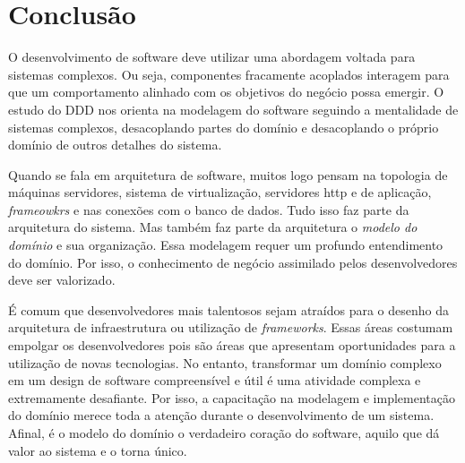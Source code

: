 \documentclass[a4paper, 12pt]{article}
\begin{document}
\section{Conclusão}

O desenvolvimento de software deve utilizar uma abordagem voltada para sistemas complexos. Ou seja, componentes fracamente acoplados interagem para que um comportamento alinhado com os objetivos do negócio possa emergir. O estudo do DDD nos orienta na modelagem do software seguindo a mentalidade de sistemas complexos, desacoplando partes do domínio e desacoplando o próprio domínio de outros detalhes do sistema. 

Quando se fala em arquitetura de software, muitos logo pensam na topologia de máquinas servidores, sistema de virtualização, servidores http e de aplicação, \emph{frameowkrs} e nas conexões com o banco de dados. Tudo isso faz parte da arquitetura do sistema. Mas também faz parte da arquitetura o \emph{modelo do domínio} e sua organização. Essa modelagem requer um profundo entendimento do domínio. Por isso, o conhecimento de negócio assimilado pelos desenvolvedores deve ser valorizado.

É comum que desenvolvedores mais talentosos sejam atraídos para o desenho da arquitetura de infraestrutura ou utilização de \emph{frameworks}. Essas áreas costumam empolgar os desenvolvedores pois são áreas que apresentam oportunidades para a utilização de novas tecnologias. No entanto, transformar  um domínio complexo em um design de software compreensível e útil é uma atividade complexa e extremamente desafiante. Por isso, a capacitação na modelagem e implementação do domínio merece toda a atenção durante o desenvolvimento de um sistema. Afinal, é o modelo do domínio o verdadeiro coração do software, aquilo que dá valor ao sistema e o torna único.









  
\end{document}
